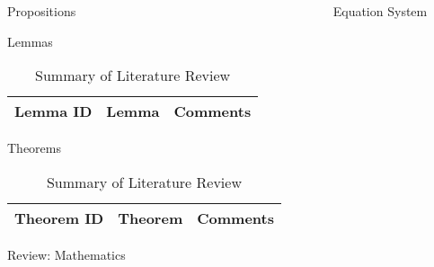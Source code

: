 \begin{frame}[t]
\begin{columns}[t]
\begin{column}{\onecolwid}
\begin{alertblock}{Propositions}
\end{alertblock}
\begin{alertblock}{Lemmas}

\begin{table}[H]
	\centering
	\begin{tabular}{r|p{12cm}|l}
	\hline
	Lemma ID  & Lemma & Comments \\
	\hline
	\hline
	\end{tabular}
	\caption{Summary of Literature Review}
\end{table} 


\end{alertblock}
\begin{alertblock}{Theorems}

\begin{table}[H]
	\centering
	\begin{tabular}{r|p{12cm}|l}
	\hline
	Theorem ID  & Theorem & Comments \\
	\hline
	\hline
	\end{tabular}
	\caption{Summary of Literature Review}
\end{table} 


\begin{theorem}
\end{theorem}

\end{alertblock}
\begin{alertblock}{Review: Mathematics}
\end{alertblock}
\end{column}
\begin{column}{\onecolwid} %
\begin{alertblock}{Equation System}


\end{alertblock}
\end{column}
\end{columns}
\end{frame}
